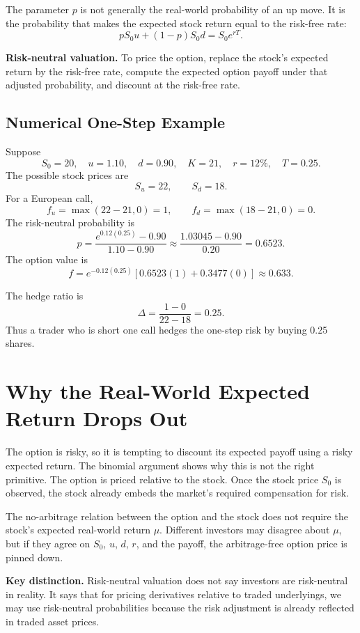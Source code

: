 The parameter $p$ is not generally the real-world probability of an up move. It
is the probability that makes the expected stock return equal to the risk-free
rate:
\[
    pS_0u+(1-p)S_0d = S_0e^{rT}.
\]

\begin{boxD}
\textbf{Risk-neutral valuation.} To price the option, replace the stock's
expected return by the risk-free rate, compute the expected option payoff under
that adjusted probability, and discount at the risk-free rate.
\end{boxD}

\subsection{Numerical One-Step Example}

Suppose
\[
    S_0=20,\quad u=1.10,\quad d=0.90,\quad K=21,\quad r=12\%,
    \quad T=0.25.
\]
The possible stock prices are
\[
    S_u=22,
    \qquad
    S_d=18.
\]
For a European call,
\[
    f_u=\max(22-21,0)=1,
    \qquad
    f_d=\max(18-21,0)=0.
\]
The risk-neutral probability is
\[
    p=
    \frac{e^{0.12(0.25)}-0.90}{1.10-0.90}
    \approx
    \frac{1.03045-0.90}{0.20}
    =0.6523.
\]
The option value is
\[
    f=e^{-0.12(0.25)}[0.6523(1)+0.3477(0)]
    \approx 0.633.
\]

The hedge ratio is
\[
    \Delta=\frac{1-0}{22-18}=0.25.
\]
Thus a trader who is short one call hedges the one-step risk by buying 0.25
shares.

\section{Why the Real-World Expected Return Drops Out}

The option is risky, so it is tempting to discount its expected payoff using a
risky expected return. The binomial argument shows why this is not the right
primitive. The option is priced relative to the stock. Once the stock price
$S_0$ is observed, the stock already embeds the market's required compensation
for risk.

The no-arbitrage relation between the option and the stock does not require the
stock's expected real-world return $\mu$. Different investors may disagree about
$\mu$, but if they agree on $S_0$, $u$, $d$, $r$, and the payoff, the
arbitrage-free option price is pinned down.

\begin{boxF}
\textbf{Key distinction.} Risk-neutral valuation does not say investors are
risk-neutral in reality. It says that for pricing derivatives relative to traded
underlyings, we may use risk-neutral probabilities because the risk adjustment is
already reflected in traded asset prices.
\end{boxF}

